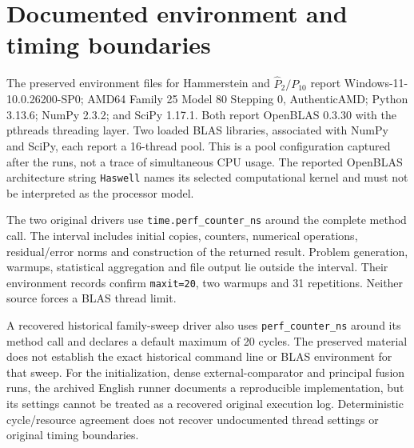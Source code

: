 \documentclass[11pt]{article}
\begin{document}
\section{Documented environment and timing boundaries}\label{sec:timing-boundaries}
The preserved environment files for Hammerstein and $\widehat P_2/P_{10}$ report Windows-11-10.0.26200-SP0; AMD64 Family 25 Model 80 Stepping 0, AuthenticAMD; Python 3.13.6; NumPy 2.3.2; and SciPy 1.17.1. Both report OpenBLAS 0.3.30 with the pthreads threading layer. Two loaded BLAS libraries, associated with NumPy and SciPy, each report a 16-thread pool. This is a pool configuration captured after the runs, not a trace of simultaneous CPU usage. The reported OpenBLAS architecture string \texttt{Haswell} names its selected computational kernel and must not be interpreted as the processor model.

The two original drivers use \texttt{time.perf\_counter\_ns} around the complete method call. The interval includes initial copies, counters, numerical operations, residual/error norms and construction of the returned result. Problem generation, warmups, statistical aggregation and file output lie outside the interval. Their environment records confirm \texttt{maxit=20}, two warmups and 31 repetitions. Neither source forces a BLAS thread limit.

A recovered historical family-sweep driver also uses \texttt{perf\_counter\_ns} around its method call and declares a default maximum of 20 cycles. The preserved material does not establish the exact historical command line or BLAS environment for that sweep. For the initialization, dense external-comparator and principal fusion runs, the archived English runner documents a reproducible implementation, but its settings cannot be treated as a recovered original execution log. Deterministic cycle/resource agreement does not recover undocumented thread settings or original timing boundaries.
\end{document}

